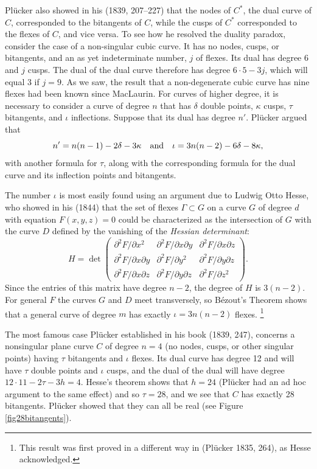 Pl\"ucker also showed in his (1839, 207--227) that the nodes of $C^{*}$,
the dual curve of $C$,  corresponded to the bitangents
%
of $C$, while
the cusps of $C^{*}$ corresponded to the flexes
%
of $C$, and vice
versa. To see how he resolved the duality paradox, consider  the case
of a non-singular cubic curve. It has no nodes, cusps, or bitangents,
and an as yet indeterminate number, $j$ of flexes. Its dual has degree 6
and $j$ cusps. The dual of the dual curve therefore has degree $6\cdot 5 - 3j$,
%
which will equal 3 if $j = 9$. As we saw, the result that a non-degenerate
cubic curve has nine flexes had been known since MacLaurin. For curves of
higher degree, it is necessary to consider a curve of degree $n$ that has
$\delta$ double points, $\kappa$ cusps, $\tau$ bitangents, and $\iota$
inflections. Suppose that its dual has degree $n'$. Pl\"ucker argued that
$$
n' = n(n-1) - 2\delta - 3 \kappa
\quad
\hbox{and}\quad \iota = 3n(n-2) - 6\delta - 8\kappa,
$$
with another formula for $\tau$, along with the corresponding formula
for the dual curve and its inflection points and bitangents.

The number $\iota$ is most easily found using an argument due to
Ludwig Otto Hesse,
%
 who showed  in his (1844)  that the set of flexes
$\Gamma\subset G$ on a curve $G$ of degree $d$ with equation $F(x, y, z)
= 0$ could be characterized as the intersection of $G$  with the curve
$D$ defined by the vanishing of the \emph{Hessian determinant}:
%
$$
H = \det \begin{pmatrix}
 \partial^{2}F/\partial x^{2} &\partial^{2}F/\partial x\partial y
 &\partial^{2}F/\partial x\partial z \\
\partial^{2}F/\partial x\partial y  &\partial^{2}F/\partial y^{2}
&\partial^{2}F/\partial y\partial z \\
\partial^{2}F/\partial x\partial z &\partial^{2}F/\partial y\partial z
&\partial^{2}F/\partial z^{2}
\end{pmatrix}.
$$
Since the entries of this matrix have degree $n-2$, the degree of $H$
is $3(n-2)$. For general $F$ the curves $G$ and $D$ meet transversely, so
B\'ezout's Theorem
%
shows that a general curve of degree $m$ has exactly
$\iota = 3n(n-2)$ flexes.%
%
\footnote{This result was first proved in a
different way in (Pl\"ucker 1835, 264), as Hesse acknowledged.}

The most famous case Pl\"ucker
%
established in  his book (1839, 247),
concerns   a nonsingular plane curve $C$ of degree $n=4$  (no nodes,
cusps, or other singular points) having $\tau$ bitangents
%
and $\iota$
flexes.
%
Its dual curve has degree 12 and will have $\tau$ double points
and $\iota$ cusps, and the dual of the dual will have degree
$12\cdot 11 - 2\tau - 3h  = 4$.
Hesse's theorem shows that $h = 24$ (Pl\"ucker  had an ad hoc argument to
the same effect)  and so $\tau = 28$,  and we  see that $C$ has exactly
28 bitangents. Pl\"ucker showed that they can all be real (see Figure
\ref{fig28bitangents}).

